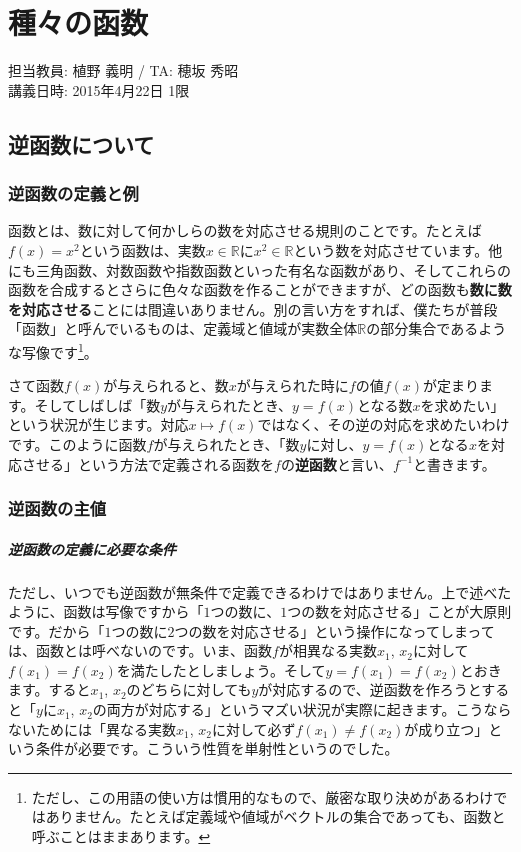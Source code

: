 \chapter{種々の函数}

\begin{flushright}
担当教員: 植野 義明 / TA: 穂坂 秀昭 \\
講義日時: 2015年4月22日 1限
\end{flushright}

\section{逆函数について}

\subsection{逆函数の定義と例}

函数とは、数に対して何かしらの数を対応させる規則のことです。たとえば$f(x)=x^2$という函数は、実数$x\in\mathbb{R}$に$x^2\in\mathbb{R}$という数を対応させています。他にも三角函数、対数函数や指数函数といった有名な函数があり、そしてこれらの函数を合成するとさらに色々な函数を作ることができますが、どの函数も\textbf{数に数を対応させる}ことには間違いありません。別の言い方をすれば、僕たちが普段「函数」と呼んでいるものは、定義域と値域が実数全体$\mathbb{R}$の部分集合であるような写像です\footnote{ただし、この用語の使い方は慣用的なもので、厳密な取り決めがあるわけではありません。たとえば定義域や値域がベクトルの集合であっても、函数と呼ぶことはままあります。}。

さて函数$f(x)$が与えられると、数$x$が与えられた時に$f$の値$f(x)$が定まります。そしてしばしば「数$y$が与えられたとき、$y=f(x)$となる数$x$を求めたい」という状況が生じます。対応$x\mapsto f(x)$ではなく、その逆の対応を求めたいわけです。このように函数$f$が与えられたとき、「数$y$に対し、$y=f(x)$となる$x$を対応させる」という方法で定義される函数を$f$の\textbf{逆函数}と言い、$f^{-1}$と書きます。

\subsection{逆函数の主値}

\paragraph{逆函数の定義に必要な条件}

ただし、いつでも逆函数が無条件で定義できるわけではありません。上で述べたように、函数は写像ですから「$1$つの数に、$1$つの数を対応させる」ことが大原則です。だから「$1$つの数に$2$つの数を対応させる」という操作になってしまっては、函数とは呼べないのです。いま、函数$f$が相異なる実数$x_1$, $x_2$に対して$f(x_1)=f(x_2)$を満たしたとしましょう。そして$y=f(x_1)=f(x_2)$とおきます。すると$x_1$, $x_2$のどちらに対しても$y$が対応するので、逆函数を作ろうとすると「$y$に$x_1$, $x_2$の両方が対応する」というマズい状況が実際に起きます。こうならないためには「異なる実数$x_1$, $x_2$に対して必ず$f(x_1)\neq f(x_2)$が成り立つ」という条件が必要です。こういう性質を$\textbf{単射性}$というのでした。

